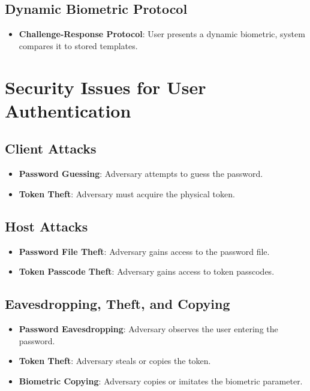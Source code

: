 \documentclass{article}
\begin{document}
\subsection{Dynamic Biometric Protocol}
\begin{itemize}
    \item \textbf{Challenge-Response Protocol}: User presents a dynamic biometric, system compares it to stored templates.
\end{itemize}

\section{Security Issues for User Authentication}
\subsection{Client Attacks}
\begin{itemize}
    \item \textbf{Password Guessing}: Adversary attempts to guess the password.
    \item \textbf{Token Theft}: Adversary must acquire the physical token.
\end{itemize}

\subsection{Host Attacks}
\begin{itemize}
    \item \textbf{Password File Theft}: Adversary gains access to the password file.
    \item \textbf{Token Passcode Theft}: Adversary gains access to token passcodes.
\end{itemize}

\subsection{Eavesdropping, Theft, and Copying}
\begin{itemize}
    \item \textbf{Password Eavesdropping}: Adversary observes the user entering the password.
    \item \textbf{Token Theft}: Adversary steals or copies the token.
    \item \textbf{Biometric Copying}: Adversary copies or imitates the biometric parameter.
\end{itemize}
\end{document}
